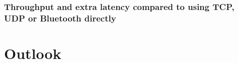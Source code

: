 \subsubsection{Throughput and extra latency compared to using TCP, UDP or Bluetooth directly}

\section{Outlook}

\filbreak